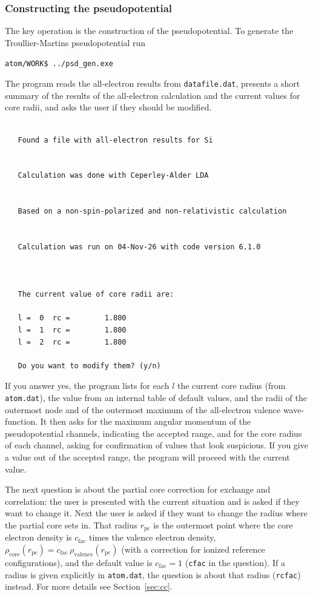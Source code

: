 \documentclass[11pt]{article}
\begin{document}
\subsubsection{Constructing the pseudopotential}
\label{sec:run-psd}

The key operation is the construction of the pseudopotential.  To generate the Troullier-Martins
pseudopotential run

\noindent\texttt{atom/WORK\$ ../psd{\_}gen.exe}

The program reads the all-electron results from \texttt{datafile.dat},
presents a short summary of the results of the all-electron calculation
and the current values for core radii, and asks the user if they should
be modified.
\begin{verbatim}

   Found a file with all-electron results for Si


   Calculation was done with Ceperley-Alder LDA


   Based on a non-spin-polarized and non-relativistic calculation


   Calculation was run on 04-Nov-26 with code version 6.1.0



   The current value of core radii are:

   l =  0  rc =        1.800
   l =  1  rc =        1.800
   l =  2  rc =        1.800

   Do you want to modify them? (y/n)
\end{verbatim}
If you answer yes, the program lists for each $l$ the current core radius (from
\texttt{atom.dat}), the value from an internal table of default values,
and the radii of the outermost node and of the outermost maximum of the
all-electron valence wave-function.  It then asks for the maximum angular momentum
of the pseudopotential channels, indicating the accepted range, and for the core radius
of each channel, asking for confirmation of values that look suspicious.
If you give a value out of the accepted range, the program will proceed with the current
value.

The next question is about the partial core correction for exchange and correlation:
the user is presented with the current situation and is asked if they want to change it.
Next the user is asked if they want to change the radius where the partial core sets in.
That radius $r_\text{pc}$ is the outermost point where the core electron density is
$c_\text{fac}$ times the valence electron density,
$\rho_\text{core}(r_\text{pc}) = c_\text{fac}\, \rho_\text{valence}(r_\text{pc})$
(with a correction for ionized reference configurations),
and the default value is $c_\text{fac} = 1$ (\texttt{cfac} in the question).
If a radius is given explicitly in \texttt{atom.dat}, the question is about that radius
(\texttt{rcfac}) instead.
For more details see Section~\ref{sec:cc}.
\end{document}
